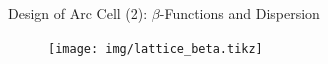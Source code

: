 \documentclass{beamer}
\begin{document}
%
\begin{frame}[t,fragile]{Design of Arc Cell (2): $\beta$-Functions and Dispersion}
\begin{figure}
\centering
\texttt{[image: img/lattice\_beta.tikz]}
\end{figure}
\end{frame}
%
%
%
\end{document}

